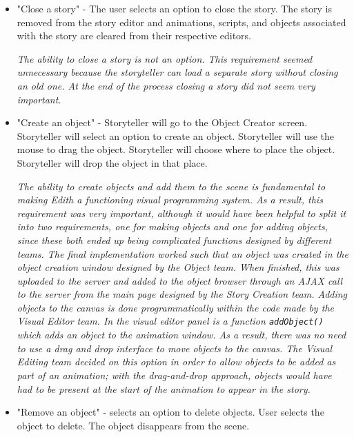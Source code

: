 \documentclass[12pt]{article}
\begin{document}
\begin{itemize}
\item "Close a story" -  The user selects an option to close the story.  The story is removed from the story editor and animations, scripts, and objects associated with the story are cleared from their respective editors.\

\textit{The ability to close a story is not an option.  This requirement seemed unnecessary because the storyteller can load a separate story without closing an old one.  At the end of the process closing a story did not seem very important.}

\item "Create an object" - Storyteller will go to the Object Creator screen. Storyteller will select an option to create an object.  Storyteller will use the mouse to drag the object. Storyteller will choose where to place the object. Storyteller will drop the object in that place.\

\textit{ The ability to create objects and add them to the scene is fundamental to making Edith a functioning visual programming system. As a result, this requirement was very important, although it would have been helpful to split it into two requirements, one for making objects and one for adding objects, since these both ended up being complicated functions designed by different teams. The final implementation worked such that an object was created in the object creation window designed by the Object team. When finished, this was uploaded to the server and added to the object browser through an AJAX call to the server from the main page designed by the Story Creation team. Adding objects to the canvas is done programmatically within the code made by the Visual Editor team. In the visual editor panel is a function \texttt{addObject()} which adds an object to the animation window. As a result, there was no need to use a drag and drop interface to move objects to the canvas. The Visual Editing team decided on this option in order to allow objects to be added as part of an animation; with the drag-and-drop approach, objects would have had to be present at the start of the animation to appear in the story.}

\item "Remove an object" - selects an option to delete objects. User selects the object to delete. The object disappears from the scene.\


\end{itemize}
\end{document}

